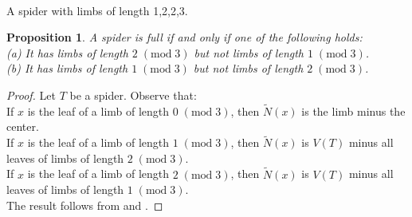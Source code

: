 \documentclass[dvipsnames,10pt]{article}
\newtheorem{proposition}[theorem]{Proposition}
\begin{document}
\begin{center}
\\
\vspace{6pt}
A spider with limbs of length 1,2,2,3.
\end{center}

\begin{proposition}
    A spider is full if and only if one of the following holds:\\
    (a) It has limbs of length $2\;(\mathrm{mod}\;3)$ but not limbs of length $1\;(\mathrm{mod}\;3)$.\\
    (b) It has limbs of length $1\;(\mathrm{mod}\;3)$ but not limbs of length $2\;(\mathrm{mod}\;3)$.
\end{proposition}

\begin{proof}
    Let $T$ be a spider. Observe that:\\
    If $x$ is the leaf of a limb of length $0\;(\mathrm{mod}\;3)$, then $\tilde{N}(x)$ is the limb minus the center.\\
    If $x$ is the leaf of a limb of length $1\;(\mathrm{mod}\;3)$, then $\tilde{N}(x)$ is $V(T)$ minus all leaves of limbs of length $2\;(\mathrm{mod}\;3)$.\\
    If $x$ is the leaf of a limb of length $2\;(\mathrm{mod}\;3)$, then $\tilde{N}(x)$ is $V(T)$ minus all leaves of limbs of length $1\;(\mathrm{mod}\;3)$.\\
    The result follows from  and .
\end{proof}
\end{document}
